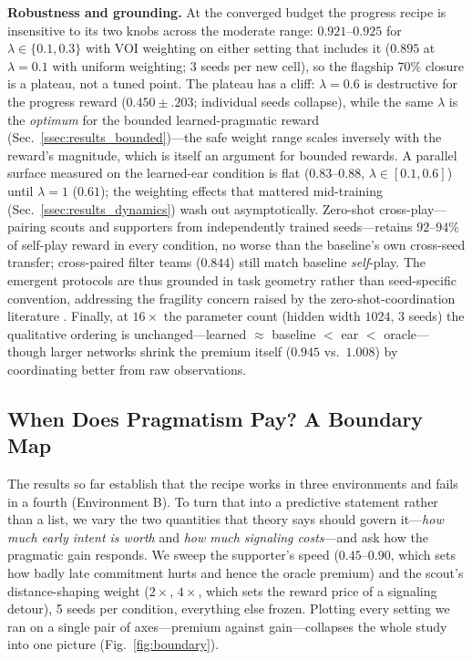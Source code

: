 \documentclass{article}
\begin{document}
\textbf{Robustness and grounding.} At the converged budget the progress recipe is insensitive to its two knobs across the moderate range: $0.921$--$0.925$ for $\lambda \in \{0.1, 0.3\}$ with VOI weighting on either setting that includes it ($0.895$ at $\lambda{=}0.1$ with uniform weighting; 3 seeds per new cell), so the flagship $70\%$ closure is a plateau, not a tuned point. The plateau has a cliff: $\lambda=0.6$ is destructive for the progress reward ($0.450\pm.203$; individual seeds collapse), while the same $\lambda$ is the \emph{optimum} for the bounded learned-pragmatic reward (Sec.~\ref{ssec:results_bounded})---the safe weight range scales inversely with the reward's magnitude, which is itself an argument for bounded rewards. A parallel surface measured on the learned-ear condition is flat ($0.83$--$0.88$, $\lambda \in [0.1, 0.6]$) until $\lambda=1$ ($0.61$); the weighting effects that mattered mid-training (Sec.~\ref{ssec:results_dynamics}) wash out asymptotically. Zero-shot cross-play---pairing scouts and supporters from independently trained seeds---retains $92$--$94\%$ of self-play reward in every condition, no worse than the baseline's own cross-seed transfer; cross-paired filter teams ($0.844$) still match baseline \emph{self}-play. The emergent protocols are thus grounded in task geometry rather than seed-specific convention, addressing the fragility concern raised by the zero-shot-coordination literature \cite{obl}. Finally, at $16\times$ the parameter count (hidden width $1024$, 3 seeds) the qualitative ordering is unchanged---learned $\approx$ baseline $<$ ear $<$ oracle---though larger networks shrink the premium itself ($0.945$ vs.\ $1.008$) by coordinating better from raw observations.

\subsection{When Does Pragmatism Pay? A Boundary Map}
\label{ssec:boundary}

The results so far establish that the recipe works in three environments and fails in a fourth (Environment B). To turn that into a predictive statement rather than a list, we vary the two quantities that theory says should govern it---\emph{how much early intent is worth} and \emph{how much signaling costs}---and ask how the pragmatic gain responds. We sweep the supporter's speed ($0.45$--$0.90$, which sets how badly late commitment hurts and hence the oracle premium) and the scout's distance-shaping weight ($2\times$, $4\times$, which sets the reward price of a signaling detour), 5 seeds per condition, everything else frozen. Plotting every setting we ran on a single pair of axes---premium against gain---collapses the whole study into one picture (Fig.~\ref{fig:boundary}).
\end{document}
